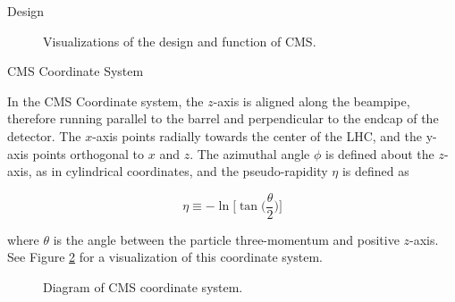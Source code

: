 \documentclass[oneside,12pt,final]{sty/ucthesis-CA2012}
\begin{document}
\begin{mainmatter}
\begin{section}{Design}
\begin{figure}[htb]
\begin{center}
\quad
{}
\end{center}
\caption{Visualizations of the design and function of CMS.}
\label{fig:cms-xsec}
\end{figure}

\end{section}
\begin{section}{CMS Coordinate System}

In the CMS Coordinate system, the $z$-axis is aligned along the beampipe, therefore running parallel to the barrel and perpendicular to the endcap of the detector. The $x$-axis points radially towards the center of the LHC, and the y-axis points orthogonal to $x$ and $z$. The azimuthal angle $\phi$ is defined about the $z$-axis, as in cylindrical coordinates, and the pseudo-rapidity $\eta$ is defined as

\begin{equation}
    \eta \equiv -\ln{\bigg[ \tan{\bigg( \frac{\theta}{2} \bigg)} \bigg]}
\end{equation}

\noindent where $\theta$ is the angle between the particle three-momentum and positive $z$-axis. See Figure \ref{fig:cms-coords} for a visualization of this coordinate system.

\begin{figure}[htb]
\begin{center}

\end{center}
\caption{Diagram of CMS coordinate system.}
\label{fig:cms-coords}
\end{figure}

\end{section}
\end{mainmatter}

\ssp


\end{document}
